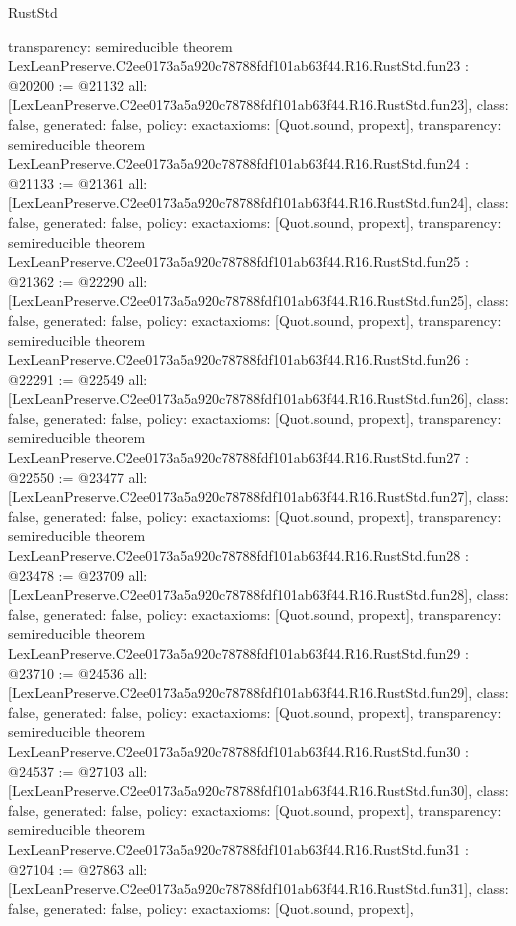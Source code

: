 \begin{lexlean}{RustStd}
\begin{coremodule}
{  transparency: semireducible
}
theorem LexLeanPreserve.C2ee0173a5a920c78788fdf101ab63f44.R16.RustStd.fun23 : @20200 := @21132 {
  all: [LexLeanPreserve.C2ee0173a5a920c78788fdf101ab63f44.R16.RustStd.fun23],
  class: false,
  generated: false,
  policy: exact{axioms: [Quot.sound, propext]},
  transparency: semireducible
}
theorem LexLeanPreserve.C2ee0173a5a920c78788fdf101ab63f44.R16.RustStd.fun24 : @21133 := @21361 {
  all: [LexLeanPreserve.C2ee0173a5a920c78788fdf101ab63f44.R16.RustStd.fun24],
  class: false,
  generated: false,
  policy: exact{axioms: [Quot.sound, propext]},
  transparency: semireducible
}
theorem LexLeanPreserve.C2ee0173a5a920c78788fdf101ab63f44.R16.RustStd.fun25 : @21362 := @22290 {
  all: [LexLeanPreserve.C2ee0173a5a920c78788fdf101ab63f44.R16.RustStd.fun25],
  class: false,
  generated: false,
  policy: exact{axioms: [Quot.sound, propext]},
  transparency: semireducible
}
theorem LexLeanPreserve.C2ee0173a5a920c78788fdf101ab63f44.R16.RustStd.fun26 : @22291 := @22549 {
  all: [LexLeanPreserve.C2ee0173a5a920c78788fdf101ab63f44.R16.RustStd.fun26],
  class: false,
  generated: false,
  policy: exact{axioms: [Quot.sound, propext]},
  transparency: semireducible
}
theorem LexLeanPreserve.C2ee0173a5a920c78788fdf101ab63f44.R16.RustStd.fun27 : @22550 := @23477 {
  all: [LexLeanPreserve.C2ee0173a5a920c78788fdf101ab63f44.R16.RustStd.fun27],
  class: false,
  generated: false,
  policy: exact{axioms: [Quot.sound, propext]},
  transparency: semireducible
}
theorem LexLeanPreserve.C2ee0173a5a920c78788fdf101ab63f44.R16.RustStd.fun28 : @23478 := @23709 {
  all: [LexLeanPreserve.C2ee0173a5a920c78788fdf101ab63f44.R16.RustStd.fun28],
  class: false,
  generated: false,
  policy: exact{axioms: [Quot.sound, propext]},
  transparency: semireducible
}
theorem LexLeanPreserve.C2ee0173a5a920c78788fdf101ab63f44.R16.RustStd.fun29 : @23710 := @24536 {
  all: [LexLeanPreserve.C2ee0173a5a920c78788fdf101ab63f44.R16.RustStd.fun29],
  class: false,
  generated: false,
  policy: exact{axioms: [Quot.sound, propext]},
  transparency: semireducible
}
theorem LexLeanPreserve.C2ee0173a5a920c78788fdf101ab63f44.R16.RustStd.fun30 : @24537 := @27103 {
  all: [LexLeanPreserve.C2ee0173a5a920c78788fdf101ab63f44.R16.RustStd.fun30],
  class: false,
  generated: false,
  policy: exact{axioms: [Quot.sound, propext]},
  transparency: semireducible
}
theorem LexLeanPreserve.C2ee0173a5a920c78788fdf101ab63f44.R16.RustStd.fun31 : @27104 := @27863 {
  all: [LexLeanPreserve.C2ee0173a5a920c78788fdf101ab63f44.R16.RustStd.fun31],
  class: false,
  generated: false,
  policy: exact{axioms: [Quot.sound, propext]},
}
\end{coremodule}
\end{lexlean}
